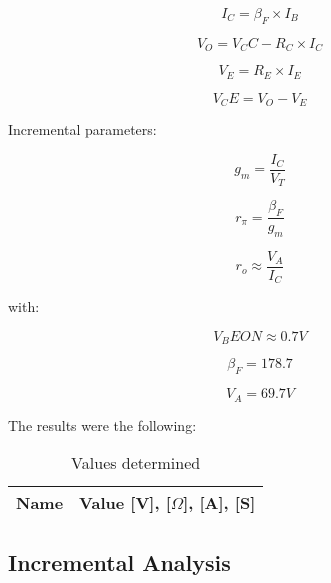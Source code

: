 \begin{equation}
I_C =\beta_F \times I_B    
\end{equation}

\begin{equation}
V_O = V_CC - R_C \times I_C    
\end{equation}

\begin{equation}
V_E = R_E \times I_E    
\end{equation}

\begin{equation}
V_CE = V_O - V_E    
\end{equation}

Incremental parameters:

\begin{equation}
 g_m = \frac{I_C}{V_T}
\end{equation}

\begin{equation}
r_\pi = \frac{\beta_F}{g_m}    
\end{equation}

\begin{equation}
r_o \approx \frac{V_A}{I_C}    
\end{equation}

with:

\begin{equation}
V_BEON \approx 0.7 V
\end{equation}

\begin{equation}
\beta_F = 178.7    
\end{equation}

\begin{equation}
V_A = 69.7 V    
\end{equation}

The results were the following:

\vspace{0.3in}
\begin{table}[ht]
  \centering
  \begin{tabular}{|l|r|}
    \hline    
    {\bf Name} & {\bf Value [V], [$\Omega$], [A], [S]} \\ \hline
    
  \end{tabular}
  \caption{Values determined}
  \label{tab:op1a}
\end{table}

\newpage

\subsection{Incremental Analysis}


